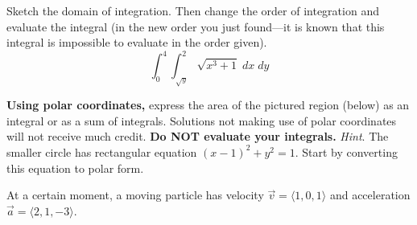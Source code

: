 \begin{questions}
    

    \question[16]
        Sketch the domain of integration. Then change the order of integration and evaluate the integral (in the new order you just found---it is known that this integral is impossible to evaluate in the order given).
        \[
            \int_0^4 \int_{\sqrt{y}}^2 \sqrt{x^3 + 1} \; dx \; dy
        \]

    \question[8] \label{prob:polar}
        \textbf{Using polar coordinates,} express the area of the pictured region (below) as an integral or as a sum of integrals. Solutions not making use of polar coordinates will not receive much credit. \textbf{Do NOT evaluate your integrals.} \emph{Hint}. The smaller circle has rectangular equation $(x-1)^2 + y^2 = 1$. Start by converting this equation to polar form.
        
    \question At a certain moment, a moving particle has velocity $\vec{v} = \langle 1, 0, 1 \rangle$ and acceleration $\vec{a} = \langle 2, 1, -3 \rangle$.


        \end{questions}

